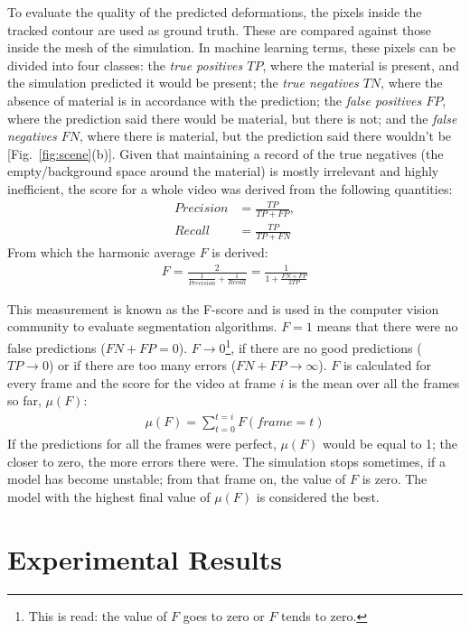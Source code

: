 \documentclass[journal]{IEEEtran}
\newcommand{\fref}[1]{Fig.~\ref{#1}}
\newcounter{algorithm}
\begin{document}
To evaluate the quality of the predicted deformations, the pixels inside the tracked contour are used as ground truth.  These are  compared against those inside the mesh of the simulation.  In machine learning terms, these pixels can be divided into four classes: the \textit{true positives $TP$}, where the material is present, and the simulation predicted it would be present; the \textit{true negatives $TN$}, where the absence of material is in accordance with the prediction; the \textit{false positives $FP$}, where the prediction said there would be material, but there is not; and the \textit{false negatives $FN$}, where there is material, but the prediction said there wouldn't be [\fref{fig:scene}(b)].  Given that maintaining a record of the true negatives (the empty/background space around the material) is mostly irrelevant and highly inefficient, the score for a whole video was derived from the following quantities:
\begin{align}
 Precision &= \frac{TP}{TP+FP}, \\
 Recall &= \frac{TP}{TP+FN}
\end{align}
From which the harmonic average $F$ is derived:
\begin{align}
 F = \frac{2}{\frac{1}{Precision} + \frac{1}{Recall}} = \frac{1}{1 + \frac{FN + FP}{2TP}}
\end{align}

This measurement is known as the F-score and is used in the computer vision community to evaluate segmentation algorithms.  $F=1$ means that there were no false predictions ($FN+FP = 0$).  $F \rightarrow 0$\footnote{This is read: the value of $F$ goes to zero or $F$ tends to zero.}, if there are no good predictions ($TP\rightarrow0$) or if there are too many errors ($FN+FP \rightarrow \infty$).  $F$ is calculated for every frame and the score for the video at frame $i$ is the mean over all the frames so far, $\mu(F)$:
\begin{align}
 \mu(F) = \sum_{t=0}^{t=i} F(frame=t)
\end{align}
If the predictions for all the frames were perfect, $\mu(F)$ would be equal to 1; the closer to zero, the more errors there were.  The simulation stops sometimes, if a model has become unstable; from that frame on, the value of $F$ is zero.  The model with the highest final value of $\mu(F)$ is considered the best.

\section{Experimental Results}
\label{sec:experiments}
\end{document}
